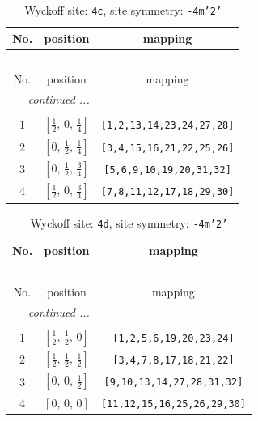 \documentclass[fleqn,8pt]{jsarticle}
\begin{document}
\renewcommand{\arraystretch}{1.2}
\begin{longtable}{ccc}
\caption{Wyckoff site: {\tt 4c}, site symmetry: {\tt -4m'2'}}
 \\
 \hline \hline
No. & position & mapping \\ \hline \endfirsthead

\multicolumn{2}{l}{\tablename\ \thetable{}} \\
 \hline \hline
No. & position & mapping \\ \hline \endhead

 \hline \hline
\multicolumn{2}{r}{\footnotesize\it continued ...} \\ \endfoot

 \hline \hline
\multicolumn{2}{r}{} \\ \endlastfoot

1 & $\left[ \frac{1}{2},\, 0,\, \frac{1}{4} \right]$ & {\tt [1,2,13,14,23,24,27,28]} \\ \hline
2 & $\left[ 0,\, \frac{1}{2},\, \frac{1}{4} \right]$ & {\tt [3,4,15,16,21,22,25,26]} \\ \hline
3 & $\left[ 0,\, \frac{1}{2},\, \frac{3}{4} \right]$ & {\tt [5,6,9,10,19,20,31,32]} \\ \hline
4 & $\left[ \frac{1}{2},\, 0,\, \frac{3}{4} \right]$ & {\tt [7,8,11,12,17,18,29,30]} \\
\end{longtable}
\renewcommand{\arraystretch}{1.2}
\begin{longtable}{ccc}
\caption{Wyckoff site: {\tt 4d}, site symmetry: {\tt -4m'2'}}
 \\
 \hline \hline
No. & position & mapping \\ \hline \endfirsthead

\multicolumn{2}{l}{\tablename\ \thetable{}} \\
 \hline \hline
No. & position & mapping \\ \hline \endhead

 \hline \hline
\multicolumn{2}{r}{\footnotesize\it continued ...} \\ \endfoot

 \hline \hline
\multicolumn{2}{r}{} \\ \endlastfoot

1 & $\left[ \frac{1}{2},\, \frac{1}{2},\, 0 \right]$ & {\tt [1,2,5,6,19,20,23,24]} \\ \hline
2 & $\left[ \frac{1}{2},\, \frac{1}{2},\, \frac{1}{2} \right]$ & {\tt [3,4,7,8,17,18,21,22]} \\ \hline
3 & $\left[ 0,\, 0,\, \frac{1}{2} \right]$ & {\tt [9,10,13,14,27,28,31,32]} \\ \hline
4 & $\left[ 0,\, 0,\, 0 \right]$ & {\tt [11,12,15,16,25,26,29,30]} \\
\end{longtable}
\end{document}
